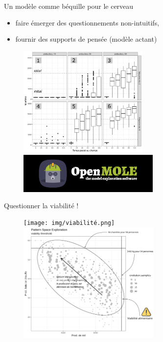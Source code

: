 \documentclass[aspectratio=169]{beamer}
\begin{document}
\begin{frame}{Un modèle comme béquille pour le cerveau}
    \begin{center}
        \vspace{-1em}

        \begin{itemize}
            \item faire émerger des questionnements non-intuitifs,
            \item fournir des supports de pensée (modèle actant)
        \end{itemize}
        \begin{figure}
            \centering
            \includegraphics[height = 5.5cm]{img/boxplotReunionDiscussion.png}~
            \includegraphics[height = 2cm]{img/OpenMOLE-Banner.png}
        \end{figure}
    \end{center}
\end{frame}

\begin{frame}{Questionner la viabilité !}
    \begin{figure}
        \centering
        \texttt{[image: img/viabilité.png]}~
        \includegraphics[height = 6cm]{../../../img/om_pse.png}
    \end{figure}
\end{frame}
\end{document}
